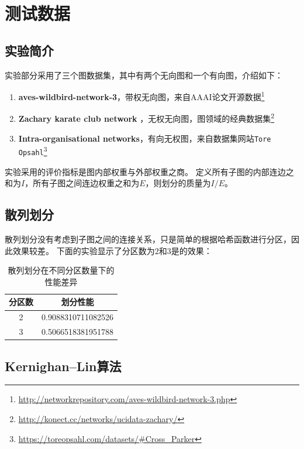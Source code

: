 \section{测试数据}

\subsection{实验简介}

实验部分采用了三个图数据集，其中有两个无向图和一个有向图，介绍如下：

\begin{enumerate}
    \item \textbf{aves-wildbird-network-3}，带权无向图，来自AAAI论文开源数据\footnote{\url{http://networkrepository.com/aves-wildbird-network-3.php}}
    \item \textbf{Zachary karate club network} ，无权无向图，图领域的经典数据集\footnote{\url{http://konect.cc/networks/ucidata-zachary/}}
    \item \textbf{Intra-organisational networks}，有向无权图，来自数据集网站\texttt{Tore Opsahl}\footnote{\url{https://toreopsahl.com/datasets/#Cross_Parker}}
\end{enumerate}

实验采用的评价指标是图内部权重与外部权重之商。
定义所有子图的内部连边之和为$I$，所有子图之间连边权重之和为$E$，则划分的质量为$I/E$。

\subsection{散列划分}

散列划分没有考虑到子图之间的连接关系，只是简单的根据哈希函数进行分区，因此效果较差。
下面的实验显示了分区数为$2$和$3$是的效果：

\begin{table}[htbp]
    \centering
    \begin{tabular}{cc}
    \hline
    分区数  & 划分性能 \\
    \hline
    2      & 0.9088310711082526 \\
    3      & 0.5066518381951788 \\
    \hline
    \end{tabular}
    \caption{散列划分在不同分区数量下的性能差异}
\end{table}

\subsection{Kernighan–Lin算法}


